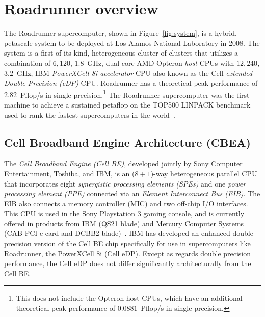 \documentclass[journal,twoside]{IEEEtran}
\newcommand{\fig}[1]{Figure~\ref{fig:#1}}
\begin{document}
\section{Roadrunner overview}

The Roadrunner supercomputer, shown in \fig{system}, is a hybrid,
petascale system to be deployed at Los Alamos National Laboratory in
2008.  The system is a first-of-its-kind, heterogeneous
cluster-of-clusters that utilizes a combination of $6,120$, $1.8$~GHz,
dual-core AMD Opteron \emph{host} CPUs with $12,240$, $3.2$~GHz, IBM
\emph{PowerXCell 8i accelerator} CPU also known as the Cell
\emph{extended Double Precision (eDP)} CPU.  Roadrunner has a
theoretical peak performance of $2.82$~Pflop/s in single
precision.\footnote{This does not include the Opteron host CPUs, which
have an additional theoretical peak performance of $0.0881$~Pflop/s in
single precision.}  The Roadrunner supercomputer was the first machine
to achieve a sustained petaflop on the TOP500 LINPACK benchmark used
to rank the fastest supercomputers in the world~\cite{top500}.

\subsection{Cell Broadband Engine Architecture (CBEA)}


The \emph{Cell Broadband Engine (Cell BE)}, developed jointly by Sony
Computer Entertainment, Toshiba, and IBM, is an ($8+1$)-way
heterogeneous parallel CPU that incorporates eight
\emph{synergistic processing elements (SPEs)} and one
\emph{power processing element (PPE)} connected via an
\emph{Element Interconnect Bus (EIB)}.  The EIB also connects
a memory controller (MIC) and two off-chip I/O interfaces.  This CPU
is used in the Sony Playstation 3 gaming console, and is currently
offered in products from IBM (QS21 blade) and Mercury Computer Systems
(CAB PCI-e card and DCBB2 blade)~\cite{mercury}.  IBM has developed an
enhanced double precision version of the Cell BE chip specifically for
use in supercomputers like Roadrunner, the PowerXCell 8i (Cell eDP).
Except as regards double precision performance, the Cell eDP does not
differ significantly architecturally from the Cell BE.
\end{document}
